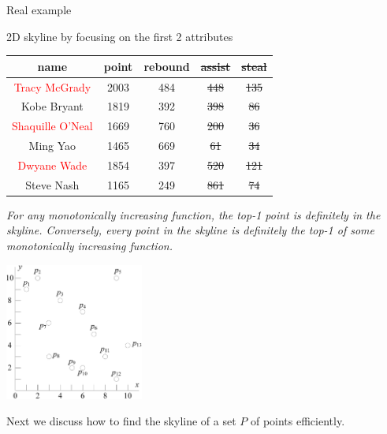 \documentclass{beamer}
\newcommand{\del}[1]{\sout{#1}}
\newcommand{\red}[1]{\textcolor{red}{#1}}
\begin{document}
\begin{frame}{Real example}
    \begin{small}
		2D skyline by focusing on the first 2 attributes
		\begin{center}
		\begin{tabular}{c|c|c|c|c}
		    name & point & rebound & \del{assist} & \del{steal} \\
			\hline
			\red{Tracy McGrady} & 2003 & 484 & \del{448} & \del{135} \\
			Kobe Bryant & 1819 & 392 & \del{398} & \del{86} \\
			\red{Shaquille O'Neal} & 1669 & 760 & \del{200} & \del{36} \\
			Ming Yao & 1465 & 669 & \del{61} & \del{34} \\
			\red{Dwyane Wade} & 1854 & 397 & \del{520} & \del{121} \\
			Steve Nash & 1165 & 249 & \del{861} & \del{74}
		\end{tabular}
		\end{center}
    \end{small}
    \end{frame}
    \begin{frame}
    \begin{small}
        \begin{theorem} \em
            For any monotonically increasing function, the top-1 point is definitely in the skyline. Conversely, every point in the skyline is definitely the top-1 of some monotonically increasing function.
        \end{theorem}

		\begin{center}
            \includegraphics[height=45mm]{./artwork/data.pdf}
        \end{center}
    \end{small}
    \end{frame}
\begin{frame}
	Next we discuss how to find the skyline of a set $P$ of points efficiently.
\end{frame}
\end{document}
